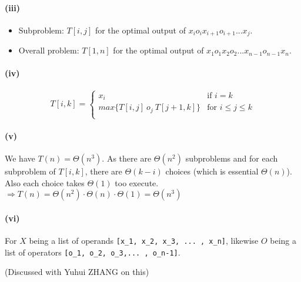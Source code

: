 \documentclass[11pt]{article}
\newcommand{\ilc}{\texttt}
\begin{document}
\paragraph{(iii)}

\begin{itemize}
    \item Subproblem: $T[i, j]$ for the optimal output of $x_i o_i x_{i+1} o_{i+1} ... x_{j}$.
    \item Overall problem: $T[1, n]$ for the optimal output of $x_1 o_1 x_2 o_2 ... x_{n-1} o_{n-1} x_n$.
\end{itemize}

\paragraph{(iv)}

\begin{equation}
    T[i,k] =
    \begin{cases}
        x_i & \text{if \ } i = k \\
        max\{T[i,j] \ o_j \ T[j+1, k]\} &\text{for \ } i \leq j \leq k \\
    \end{cases}\nonumber
\end{equation}

\paragraph{(v)}

We have $T(n) = \Theta(n^3)$. As there are $\Theta(n^2)$ subproblems and for each subproblem of $T[i,k]$, there are $\Theta(k-i)$ choices (which is essential $\Theta(n)$). Also each choice takes $\Theta(1)$ too execute. \\
$\Longrightarrow T(n) =  \Theta(n^2) \cdot  \Theta(n) \cdot \Theta(1) =  \Theta(n^3)$


\paragraph{(vi)}
For $X$ being a list of operands \ilc{[x\_{1}, x\_{2}, x\_{3}, ... , x\_{n}]}, likewise $O$ being a list of operators \ilc{[o\_{1}, o\_{2}, o\_{3},... , o\_{n-1}]}.

(Discussed with Yuhui ZHANG on this)
\end{document}
